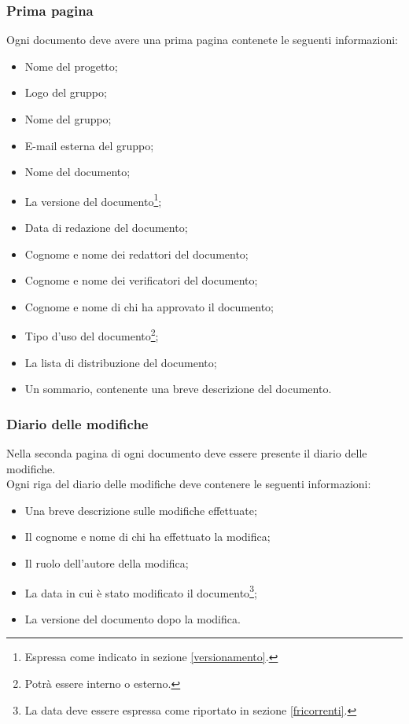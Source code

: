 \subsubsection{Prima pagina}
\label{primapag}
Ogni documento deve avere una prima pagina contenete le seguenti informazioni:
\begin{itemize}
\item Nome del progetto;
\item Logo del gruppo;
\item Nome del gruppo;
\item E-mail esterna del gruppo;
\item Nome del documento;
\item La versione del documento\footnote{Espressa come indicato in sezione \ref{versionamento}.};
\item Data di redazione del documento;
\item Cognome e nome dei redattori del documento;
\item Cognome e nome dei verificatori del documento;
\item Cognome e nome di chi ha approvato il documento;
\item Tipo d'uso del documento\footnote{Potrà essere interno o esterno.};
\item La lista di distribuzione del documento;
\item Un sommario, contenente una breve descrizione del documento.
\end{itemize}

\subsubsection{Diario delle modifiche}
\label{diariomod}
Nella seconda pagina di ogni documento deve essere presente il diario delle modifiche.
\\Ogni riga del diario delle modifiche deve contenere le seguenti informazioni:
\begin{itemize}
\item Una breve descrizione sulle modifiche effettuate;
\item Il cognome e nome di chi ha effettuato la modifica;
\item Il ruolo dell'autore della modifica;
\item La data in cui è stato modificato il documento\footnote{La data deve essere espressa come riportato in sezione \ref{fricorrenti}.};
\item La versione del documento dopo la modifica.
\end{itemize}

